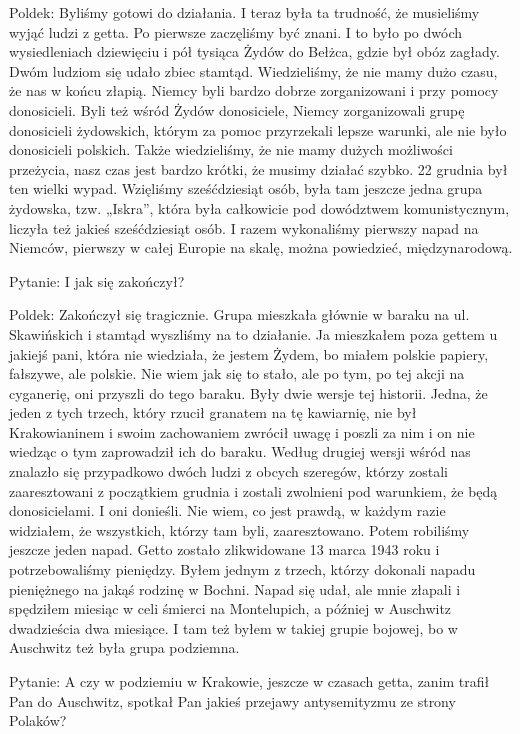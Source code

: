 Poldek: Byliśmy gotowi do działania. I teraz była ta trudność, że musieliśmy wyjąć ludzi z getta. Po pierwsze zaczęliśmy być znani. I to było po dwóch wysiedleniach dziewięciu i pół tysiąca Żydów do Bełżca, gdzie był obóz zagłady. Dwóm ludziom się udało zbiec stamtąd. Wiedzieliśmy, że nie mamy dużo czasu, że nas w końcu złapią. Niemcy byli bardzo dobrze zorganizowani i przy pomocy donosicieli. Byli też wśród Żydów donosiciele, Niemcy zorganizowali grupę donosicieli żydowskich, którym za pomoc przyrzekali lepsze warunki, ale nie było donosicieli polskich. Także wiedzieliśmy, że nie mamy dużych możliwości przeżycia, nasz czas jest bardzo krótki, że musimy działać szybko. 22 grudnia był ten wielki wypad. Wzięliśmy sześćdziesiąt osób, była tam jeszcze jedna grupa żydowska, tzw. „Iskra”, która była całkowicie pod dowództwem komunistycznym, liczyła też jakieś sześćdziesiąt osób. I razem wykonaliśmy pierwszy napad na Niemców, pierwszy w całej Europie na skalę, można powiedzieć, międzynarodową.  

Pytanie: I jak się zakończył? 

Poldek: Zakończył się tragicznie. Grupa mieszkała głównie w baraku na ul. Skawińskich i stamtąd wyszliśmy na to działanie. Ja mieszkałem poza gettem u jakiejś pani, która nie wiedziała, że jestem Żydem, bo miałem polskie papiery, fałszywe, ale polskie.  Nie wiem jak się to stało, ale po tym, po tej akcji na cyganerię, oni przyszli do tego baraku. Były dwie wersje tej historii. Jedna, że jeden z tych trzech, który rzucił granatem na tę kawiarnię, nie był Krakowianinem i swoim zachowaniem zwrócił uwagę i poszli za nim i on nie wiedząc o tym zaprowadził ich do baraku. Według drugiej wersji wśród nas znalazło się przypadkowo dwóch ludzi z obcych szeregów, którzy zostali zaaresztowani z początkiem grudnia i zostali zwolnieni pod warunkiem, że będą donosicielami. I oni donieśli. Nie wiem, co jest prawdą, w każdym razie widziałem, że wszystkich, którzy tam byli, zaaresztowano. Potem robiliśmy jeszcze jeden napad. Getto zostało zlikwidowane 13 marca 1943 roku i potrzebowaliśmy pieniędzy. Byłem jednym z trzech, którzy dokonali napadu pieniężnego na jakąś rodzinę w Bochni. Napad się udał, ale mnie złapali i spędziłem miesiąc w celi śmierci na Montelupich, a później w Auschwitz dwadzieścia dwa miesiące. I tam też byłem w takiej grupie bojowej, bo w Auschwitz też była grupa podziemna.   

Pytanie: A czy w podziemiu w Krakowie, jeszcze w czasach getta, zanim trafił Pan do Auschwitz, spotkał Pan jakieś przejawy antysemityzmu ze strony Polaków?  

